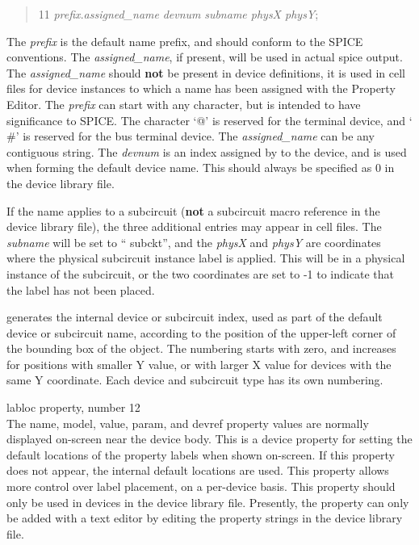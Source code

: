 \begin{description}
\begin{quote}
{ 11} {\it prefix\/}.{\it assigned\_name\/} {\it devnum}
{\it subname physX physY\/};
\end{quote}

The {\it prefix} is the default name prefix, and should conform to the
SPICE conventions.  The {\it assigned\_name\/}, if present, will be
used in actual spice output.  The {\it assigned\_name} should {\bf
not} be present in device definitions, it is used in cell
files for device instances to which a name has been assigned with the
{\cb Property Editor}.  The {\it prefix} can start with any
character, but is intended to have significance to SPICE.  The
character `{\vt @}' is reserved for the terminal device, and `{\vt
\#}' is reserved for the bus terminal device.  The {\it
assigned\_name\/} can be any contiguous string.  The {\it devnum} is
an index assigned by {\Xic} to the device, and is used when forming
the default device name.  This should always be specified as 0 in the
device library file.

If the name applies to a subcircuit ({\bf not\/} a subcircuit macro
reference in the device library file), the three additional entries
may appear in cell files.  The {\it subname} will be set to ``{\vt
subckt}'', and the {\it physX} and {\it physY} are coordinates where
the physical subcircuit instance label is applied.  This will be in a
physical instance of the subcircuit, or the two coordinates are set to
-1 to indicate that the label has not been placed.

{\Xic} generates the internal device or subcircuit index, used as part
of the default device or subcircuit name, according to the position of
the upper-left corner of the bounding box of the object.  The
numbering starts with zero, and increases for positions with smaller Y
value, or with larger X value for devices with the same Y coordinate. 
Each device and subcircuit type has its own numbering.

\item{\et labloc} property, number 12\\
The {\et name}, {\et model}, {\et value}, {\et param}, and {\et
devref} property values are normally displayed on-screen near the
device body.  This is a device property for setting the default
locations of the property labels when shown on-screen.  If this
property does not appear, the internal default locations are used. 
This property allows more control over label placement, on a
per-device basis.  This property should only be used in devices in the
device library file.  Presently, the property can only be added with a
text editor by editing the property strings in the device library
file.


\end{description}
